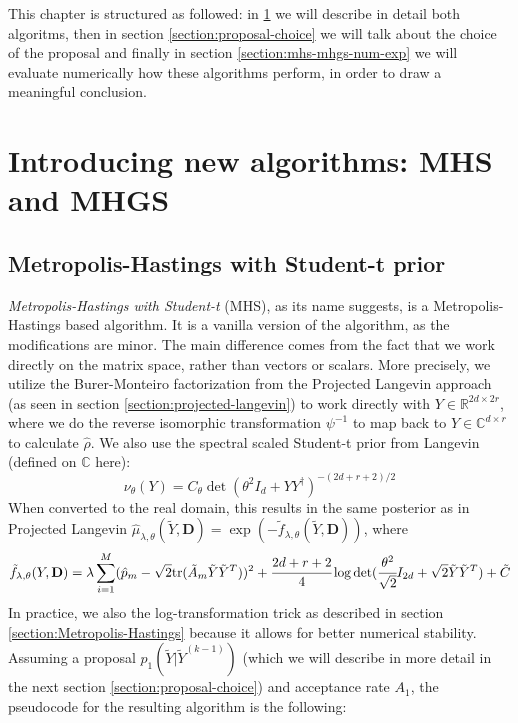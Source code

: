 \documentclass[12pt]{memoir}
\newcommand{\tr}{\text{tr}}
\newcommand{\mb}{\mathbf}
\begin{document}
This chapter is structured as followed: in \ref{section:mhs-and-mhgs} we will describe in detail both algoritms, then in section \ref{section:proposal-choice} we will talk about the choice of the proposal and finally in section \ref{section:mhs-mhgs-num-exp} we will evaluate numerically how these algorithms perform, in order to draw a meaningful conclusion.
\section{Introducing new algorithms: MHS and MHGS}\label{section:mhs-and-mhgs}
\subsection*{Metropolis-Hastings with Student-t prior}
\textit{Metropolis-Hastings with Student-t} (MHS), as its name suggests, is a Metropolis-Hastings based algorithm. It is a vanilla version of the algorithm, as the modifications are minor. The main difference comes from the fact that we work directly on the matrix space, rather than vectors or scalars. More precisely, we utilize the Burer-Monteiro factorization from the Projected Langevin approach (as seen in section \ref{section:projected-langevin}) to work directly with $Y \in \mathbb{R}^{2d \times 2r}$, where we do the reverse isomorphic transformation $\psi^{-1}$ to map back to $Y \in \mathbb{C}^{d\times r}$ to calculate $\hat \rho$. We also use the spectral scaled Student-t prior from Langevin (defined on $\mathbb{C}$ here):
\begin{equation}
    \nu_{\theta} (Y) = C_\theta \det(\theta^2I_d + YY^\dagger)^{-(2d+r+2)/2}
\end{equation}
When converted to the real domain, this results in the same posterior as in Projected Langevin $\hat \mu_{\lambda, \theta}(\tilde Y, \mb D) =\exp(-\tilde f_{\lambda, \theta}(\tilde Y, \mb D))$, where 
\begin{equation}
    \tilde f_{\lambda, \theta}(Y, \mb D) = \lambda \sum^{M}_{i=1} (\hat p_m - \sqrt{2}\tr(\tilde A_m \tilde Y \tilde Y^{T}))^2 + \cfrac{2d + r + 2}{4}\log \det(\cfrac{\theta^2}{\sqrt 2}I_{2d} + \sqrt 2 \tilde Y \tilde Y^{T}) + \tilde C
\end{equation}
In practice, we also the log-transformation trick as described in section \ref{section:Metropolis-Hastings} because it allows for better numerical stability. Assuming a proposal $p_1(\tilde Y|\tilde Y^{(k-1)})$ (which we will describe in more detail in the next section \ref{section:proposal-choice}) and acceptance rate $A_1$, the pseudocode for the resulting algorithm is the following:\medbreak
\end{document}
